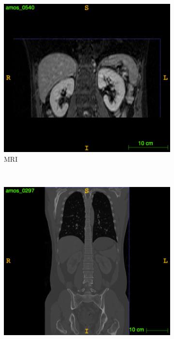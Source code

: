 \documentclass{l4proj}
\begin{document}
\begin{figure}[htb] 
    \centering
    \begin{subfigure}[b]{0.45\textwidth}
        \includegraphics[width=\textwidth]{images/MRI_screenshot.png}
        \caption{MRI}
        \label{fig:mri_scan}
    \end{subfigure}
    ~ %
    \begin{subfigure}[b]{0.45\textwidth}
        \includegraphics[width=\textwidth]{images/CT_screenshot.png}

\end{subfigure}
\end{figure}
\end{document}

